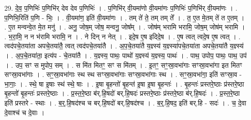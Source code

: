 \documentclass[17pt]{extarticle}
\begin{document}
29. दे॒व॒ प॒णिभिः॑ प॒णिभि॑र् देव देव प॒णिभिः॑ । . प॒णिभि॑र् वी॒यमा॑णो वी॒यमा॑णः प॒णिभिः॑ प॒णिभि॑र् वी॒यमा॑णः । . प॒णिभि॒रिति॑ प॒णि - भिः॒ । . वी॒यमा॑ण॒ इति॑ वी॒यमा॑णः । . तम् ते॑ ते॒ तम् तम् ते᳚ । . त॒ ए॒त मे॒तम् ते॑ त ए॒तम् । . ए॒त मन्वन्वे॒त मे॒त मनु॑ । . अनु॒ जोष॒म् जोष॒ मन्वनु॒ जोष᳚म् । . जोष॑म् भरामि भरामि॒ जोष॒म् जोष॑म् भरामि । . भ॒रा॒मि॒ न न भ॑रामि भरामि॒ न । . ने दिन् न नेत् । . इदे॒ष ए॒ष इदिदे॒ष । . ए॒ष त्वत् त्वदे॒ष ए॒ष त्वत् । . त्वद॑पचे॒तया॑ता अपचे॒तया॑तै॒ त्वत् त्वद॑पचे॒तया॑तै । . अ॒प॒चे॒तया॑तै य॒ज्ञ्स्य॑ य॒ज्ञ्स्या॑पचे॒तया॑ता अपचे॒तया॑तै य॒ज्ञ्स्य॑ । . अ॒प॒चे॒तया॑ता॒ इत्य॑प - चे॒तया॑तै । . य॒ज्ञ्स्य॒ पाथः॒ पाथो॑ य॒ज्ञ्स्य॑ य॒ज्ञ्स्य॒ पाथः॑ । . पाथ॒ उपोप॒ पाथः॒ पाथ॒ उप॑ । . उप॒ सꣳ स मुपोप॒ सम् । . स मि॑त मितꣳ॒॒ सꣳ स मि॑तम् । . इ॒तꣳ॒॒ सꣳ॒॒स्रा॒वभा॑गाः सꣳस्रा॒वभा॑गा इत मितꣳ सꣳस्रा॒वभा॑गाः । . सꣳ॒॒स्रा॒वभा॑गाः स्थ स्थ सꣳस्रा॒वभा॑गाः सꣳस्रा॒वभा॑गाः स्थ । . सꣳ॒॒स्रा॒वभा॑गा॒ इति॑ सꣳस्रा॒व - भा॒गाः॒ । . स्थे॒ षा इ॒षाः स्थ॑ स्थे॒ षाः । . इ॒षा बृ॒हन्तो॑ बृ॒हन्त॑ इ॒षा इ॒षा बृ॒हन्तः॑ । . बृ॒हन्तः॑ प्रस्तरे॒ष्ठाः प्र॑स्तरे॒ष्ठा बृ॒हन्तो॑ बृ॒हन्तः॑ प्रस्तरे॒ष्ठाः । . प्र॒स्त॒रे॒ष्ठा ब॑र्.हि॒षदो॑ बर्.हि॒षदः॑ प्रस्तरे॒ष्ठाः प्र॑स्तरे॒ष्ठा ब॑र्.हि॒षदः॑ । . प्र॒स्त॒रे॒ष्ठा इति॑ प्रस्तरे - स्थाः । . ब॒र्॒.हि॒षद॑श्च च बर्.हि॒षदो॑ बर्.हि॒षद॑श्च । . ब॒र्॒.हि॒षद॒ इति॑ बर्.हि - सदः॑ । . च॒ दे॒वा दे॒वाश्च॑ च दे॒वाः । \newline
\end{document}
